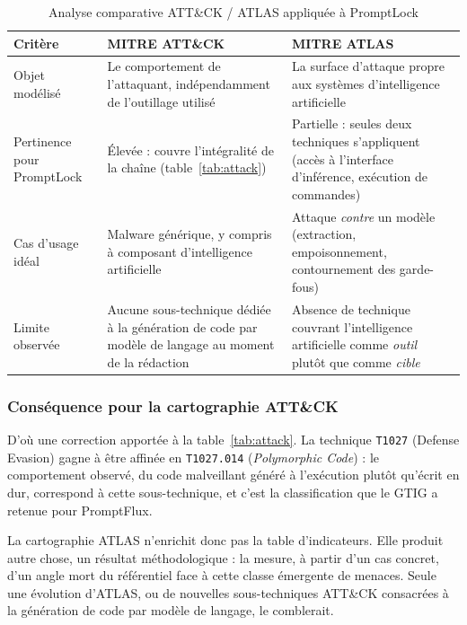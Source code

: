 \begin{table}[htbp]
  \centering
  \small
  \setlength{\parindent}{0pt}
  \setlength{\tabcolsep}{5pt}
  \renewcommand{\arraystretch}{1.25}
  \caption{Analyse comparative ATT\&CK / ATLAS appliquée à PromptLock}
  \label{tab:attack-vs-atlas}
  \begin{tabularx}{\linewidth}{@{}
      >{\RaggedRight\arraybackslash}p{3.1cm}
      >{\RaggedRight\arraybackslash}X
      >{\RaggedRight\arraybackslash}X @{}}
    \toprule
    \textbf{Critère} & \textbf{MITRE ATT\&CK} & \textbf{MITRE ATLAS} \\
    \midrule
    Objet modélisé
      & Le comportement de l'attaquant, indépendamment de l'outillage utilisé
      & La surface d'attaque propre aux systèmes d'intelligence artificielle \\
    \addlinespace
    Pertinence pour PromptLock
      & Élevée : couvre l'intégralité de la chaîne (table~\ref{tab:attack})
      & Partielle : seules deux techniques s'appliquent (accès à l'interface
        d'inférence, exécution de commandes) \\
    \addlinespace
    Cas d'usage idéal
      & Malware générique, y compris à composant d'intelligence artificielle
      & Attaque \emph{contre} un modèle (extraction, empoisonnement,
        contournement des garde-fous) \\
    \addlinespace
    Limite observée
      & Aucune sous-technique dédiée à la génération de code par modèle de
        langage au moment de la rédaction
      & Absence de technique couvrant l'intelligence artificielle comme
        \emph{outil} plutôt que comme \emph{cible} \\
    \bottomrule
  \end{tabularx}
\end{table}

\subsubsection{Conséquence pour la cartographie ATT\&CK}

D'où une correction apportée à la table~\ref{tab:attack}. La technique \texttt{T1027}
(Defense Evasion) gagne à être affinée en \texttt{T1027.014} (\emph{Polymorphic Code}) :
le comportement observé, du code malveillant généré à l'exécution plutôt qu'écrit en dur,
correspond à cette sous-technique, et c'est la classification que le GTIG a retenue pour
PromptFlux.

La cartographie ATLAS n'enrichit donc pas la table d'indicateurs. Elle produit autre
chose, un résultat méthodologique : la mesure, à partir d'un cas concret, d'un angle mort
du référentiel face à cette classe émergente de menaces. Seule une évolution d'ATLAS, ou
de nouvelles sous-techniques ATT\&CK consacrées à la génération de code par modèle de
langage, le comblerait.